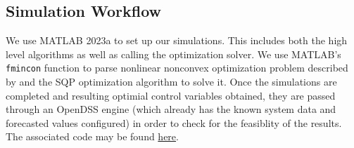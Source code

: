 \documentclass[../../outputs/main.tex]{subfiles}
\begin{document}
\subsection{Simulation Workflow}

We use MATLAB 2023a to set up our simulations. This includes both the high level algorithms as well as calling the optimization solver. We use MATLAB's \texttt{fmincon} function to parse nonlinear nonconvex optimization problem described by  and the SQP optimization algorithm to solve it. Once the simulations are completed and resulting optimial control variables obtained, they are passed through an OpenDSS engine (which already has the known system data and forecasted values configured) in order to check for the feasiblity of the results. The associated code may be found \href{https://github.com/Realife-Brahmin/MultiPeriod-DistOPF-Benchmark}{here}.

\end{document}
